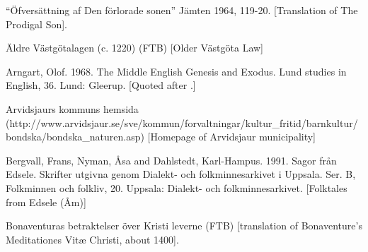 \begin{listWWNumileveli}
\item {}

\begin{styleSource}
“Öfversättning af Den förlorade sonen” Jämten 1964, 119-20. [Translation of The Prodigal Son]. 

\end{styleSource}

\item {}

\begin{styleSource}
\label{bkm:Ref154219978}Äldre Västgötalagen (c. 1220) (FTB) [Older Västgöta Law]

\end{styleSource}

\item {}

\begin{styleSource}
\label{bkm:Ref151372879}Arngart, Olof. 1968. The Middle English Genesis and Exodus. Lund studies in English, 36. Lund: Gleerup. [Quoted after \citet{Allen1997}.]

\end{styleSource}

\item {}

\begin{styleSource}
\label{bkm:Ref137879837}Arvidsjaurs kommuns hemsida (http://www.arvidsjaur.se/sve/kommun/forvaltningar/kultur\_fritid/barnkultur/bondska/bondska\_naturen.asp) [Homepage of Arvidsjaur municipality]

\end{styleSource}

\item {}

\begin{styleSource}
\label{bkm:Ref150329670}Bergvall, Frans, Nyman, Åsa and Dahlstedt, Karl-Hampus. 1991. Sagor från Edsele. Skrifter utgivna genom Dialekt- och folkminnesarkivet i Uppsala. Ser. B, Folkminnen och folkliv, 20. Uppsala: Dialekt- och folkminnesarkivet. [Folktales from Edsele (Åm)]

\end{styleSource}

\item {}

\begin{styleSource}
\label{bkm:Ref154213744}Bonaventuras betraktelser över Kristi leverne (FTB) [translation of Bonaventure’s Meditationes Vitæ Christi, about 1400]. 


\end{styleSource}
\end{listWWNumileveli}
